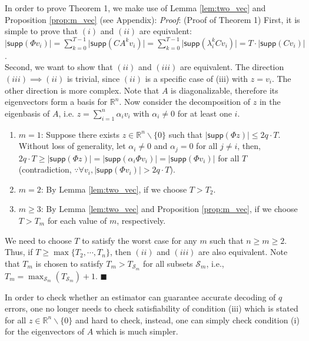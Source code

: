 \documentclass[../../thesis.tex]{subfiles}
\begin{document}
In order to prove Theorem 1, we make use of Lemma \ref{lem:two_vec} and Proposition \ref{prop:m_vec} (see Appendix): 
\textit{Proof}: (Proof of Theorem 1)
First, it is simple to prove that $(i)$ and $(ii)$ are equivalent: $\lvert \textsf{supp} (\Phi v_i) \rvert = \sum_{k=0}^{T-1} \lvert \textsf{supp} (CA^k v_i ) \rvert = \sum_{k=0}^{T-1} \lvert  \textsf{supp} (\lambda_i^k C v_i )\rvert  = T\cdot  \lvert \textsf{supp} (C v_i) \rvert  $. \\
Second, we want to show that $(ii)$ and $(iii)$ are equivalent. The direction $(iii) \implies (ii)$ is trivial, since $(ii)$ is a specific case of (iii) with $z = v_i$. The other direction is more complex. Note that $A$ is diagonalizable, therefore its eigenvectors form a basis for $\mathbb{R}^n$. Now consider the decomposition of $z $ in the eigenbasis of $A$, i.e. $z = \sum_{i=1}^n \alpha_i v_i$ with $\alpha_i \neq 0$ for at least one $i$. 
\begin{enumerate}
\item $m=1$: Suppose there exists $z \in \mathbb{R}^n \backslash \{ 0\}$ such that $ \lvert \textsf{supp} (\Phi z) \rvert \le 2 q \cdot T$. Without loss of generality, let $\alpha_i \neq 0$ and $\alpha_j= 0$ for all $j \neq i$, then, $2 q \cdot T \ge \lvert \textsf{supp} (\Phi z) \rvert = \lvert \textsf{supp} (\alpha_i \Phi v_i) \rvert = \lvert \textsf{supp} (\Phi v_i) \rvert $ for all $T$ (contradiction, $\because \forall v_i, \lvert \textsf{supp} (\Phi v_i) \rvert  > 2 q \cdot T$). 
\item $m=2$: By Lemma \ref{lem:two_vec}, if we choose $T>T_2$.
\item $m\ge 3$: By Lemma \ref{lem:two_vec} and Proposition \ref{prop:m_vec}, if we choose $T>T_m$ for each value of $m$, respectively.
\end{enumerate}
We need to choose $T$ to satisfy the worst case for any $m$ such that $n \ge m \ge 2$. Thus, if $T \ge \max \{ T_2, \cdots, T_n \}$, then $(ii)$ and $(iii)$ are also equivalent. Note that $T_m$ is chosen to satisfy $T_m > T_{\mathcal{S}_m}$ for all subsets $\mathcal{S}_m$, i.e., $T_m = \max_{\mathcal{S}_m}( T_{\mathcal{S}_m})+1$.
\hfill$\blacksquare$

In order to check whether an estimator can guarantee accurate decoding of $q$ errors, one no longer needs to check satisfiability of condition (iii) which is stated for all $z \in \mathbb{R}^n\backslash \{0 \}$ and hard to check, instead, one can simply check condition (i) for the eigenvectors of $A$ which is much simpler.
\end{document}

